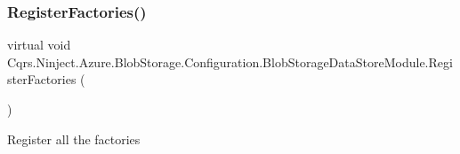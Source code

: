 \subsubsection{\texorpdfstring{Register\+Factories()}{RegisterFactories()}}
{\footnotesize\ttfamily virtual void Cqrs.\+Ninject.\+Azure.\+Blob\+Storage.\+Configuration.\+Blob\+Storage\+Data\+Store\+Module.\+Register\+Factories (\begin{DoxyParamCaption}{ }\end{DoxyParamCaption})\hspace{0.3cm}{\ttfamily [virtual]}}



Register all the factories 

